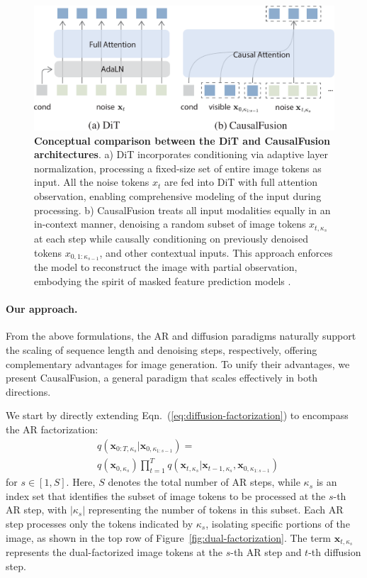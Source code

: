 \begin{figure}[t]
    \centering
    \includegraphics[width=1.02\linewidth]{figs/CasualFusion-arch.pdf}
    \caption{\textbf{Conceptual comparison between the DiT and CausalFusion architectures}. a) DiT incorporates conditioning via adaptive layer normalization, processing a fixed-size set of entire image tokens as input. All the noise tokens $x_t$ are fed into DiT with full attention observation, enabling comprehensive modeling of the input during processing.
    b) CausalFusion treats all input modalities equally in an in-context manner, denoising a random subset of image tokens $x_{t, \kappa_s}$ at each step while causally conditioning on previously denoised tokens $x_{0, 1:\kappa_{s-1}}$, and other contextual inputs. This approach enforces the model to reconstruct the image with partial observation, embodying the spirit of masked feature prediction models \cite{he2022masked, maskedpredict, flip}.
    \vspace{-5pt}
    }
    \label{fig:arch}
\end{figure}



\paragraph{Our approach.}
From the above formulations, the AR and diffusion paradigms naturally support the scaling of sequence length and denoising steps, respectively, offering complementary advantages for image generation. To unify their advantages, we present CausalFusion, a general paradigm that scales effectively in both directions. 

We start by directly extending Eqn.~(\ref{eq:diffusion-factorization}) to encompass the AR factorization:
\begin{align}\label{eq:cd-factorization}
& q(\mathbf{x}_{0:T,\kappa_s} | \mathbf{x}_{0,\kappa_{1:s-1}}) = \nonumber \\ 
& q(\mathbf{x}_{0,\kappa_s}) \prod_{t=1}^T q(\mathbf{x}_{t,\kappa_s} | \mathbf{x}_{t-1,\kappa_s},\mathbf{x}_{0,\kappa_{1:s-1}}) \tag{5}
\end{align}
for $s \in [1, S]$. Here, $S$ denotes the total number of AR steps, while $\kappa_s$ is an index set that identifies the subset of image tokens to be processed at the $s$-th AR step, with $|\kappa_s|$ representing the number of tokens in this subset. Each AR step processes only the tokens indicated by $\kappa_s$, isolating specific portions of the image, as shown in the top row of Figure~\ref{fig:dual-factorization}. The term $\mathbf{x}_{t,\kappa_s}$ represents the dual-factorized image tokens at the $s$-th AR step and $t$-th diffusion step.

